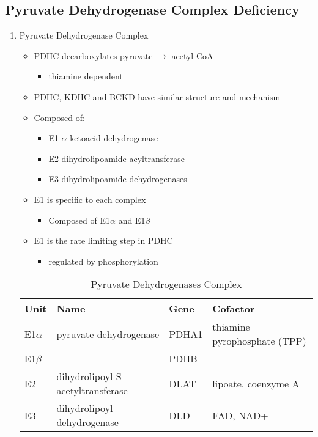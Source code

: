 \documentclass{scrartcl}
\begin{document}
\subsection{Pyruvate Dehydrogenase Complex Deficiency}
\label{sec:org70eda43}
\begin{enumerate}
\item Pyruvate Dehydrogenase Complex
\label{sec:org50cc414}
\begin{itemize}
\item PDHC decarboxylates pyruvate \(\to\) acetyl-CoA
\begin{itemize}
\item thiamine dependent
\end{itemize}
\item PDHC, KDHC and BCKD have similar structure and mechanism
\item Composed of:
\begin{itemize}
\item E1 \(\alpha\)-ketoacid dehydrogenase
\item E2 dihydrolipoamide acyltransferase
\item E3 dihydrolipoamide dehydrogenases
\end{itemize}
\item E1 is specific to each complex
\begin{itemize}
\item Composed of E1\(\alpha\) and E1\(\beta\)
\end{itemize}
\item E1 is the rate limiting step in PDHC
\begin{itemize}
\item regulated by phosphorylation
\end{itemize}
\end{itemize}

\begin{table}[htbp]
\caption{\label{tab:org0163963}
Pyruvate Dehydrogenases Complex}
\centering
\begin{tabular}{llll}
Unit & Name & Gene & Cofactor\\
\hline
E1\(\alpha\) & pyruvate dehydrogenase & PDHA1 & thiamine pyrophosphate (TPP)\\
E1\(\beta\) &  & PDHB & \\
E2 & dihydrolipoyl  S-acetyltransferase & DLAT & lipoate, coenzyme A\\
E3 & dihydrolipoyl dehydrogenase & DLD & FAD, NAD+\\
\end{tabular}
\end{table}




\end{enumerate}
\end{document}
